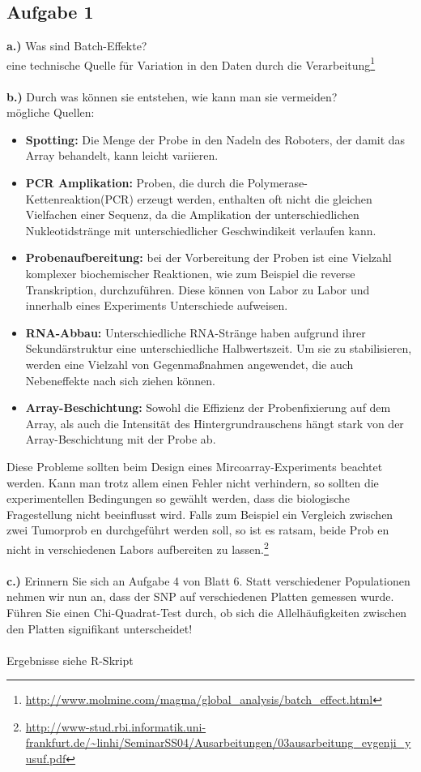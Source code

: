 \documentclass[13pt,a4paper]{article}
\begin{document}
\subsection{Aufgabe 1}
\textbf{a.)} Was sind Batch-Effekte?\\
eine technische Quelle für Variation in den Daten durch die Verarbeitung\footnote{\url{http://www.molmine.com/magma/global_analysis/batch_effect.html}}
\\\\
\textbf{b.)} Durch was können sie entstehen, wie kann man sie vermeiden?\\
mögliche Quellen:
\begin{itemize}
	\item \textbf{Spotting:} Die Menge der Probe in den Nadeln des Roboters, der damit das Array behandelt, kann leicht variieren.
	\item \textbf{PCR Amplikation:} Proben, die durch die Polymerase-Kettenreaktion(PCR) erzeugt werden, enthalten oft nicht die gleichen Vielfachen einer Sequenz, da die Amplikation der unterschiedlichen Nukleotidstränge mit unterschiedlicher Geschwindikeit verlaufen kann.
	\item \textbf{Probenaufbereitung:} bei der Vorbereitung der Proben ist eine Vielzahl komplexer biochemischer Reaktionen, wie zum Beispiel die reverse Transkription, durchzuführen. Diese können von Labor zu Labor und innerhalb eines Experiments Unterschiede aufweisen.
	\item \textbf{RNA-Abbau:} Unterschiedliche RNA-Stränge haben aufgrund ihrer Sekundärstruktur eine unterschiedliche Halbwertszeit. Um sie zu stabilisieren, werden eine Vielzahl von Gegenmaßnahmen angewendet, die auch Nebeneffekte nach sich ziehen können.
	\item \textbf{Array-Beschichtung:} Sowohl die Effizienz der Probenfixierung auf dem Array, als auch die Intensität des Hintergrundrauschens hängt stark von der Array-Beschichtung mit der Probe ab.
\end{itemize}
Diese Probleme sollten beim Design eines Mircoarray-Experiments beachtet werden. Kann man trotz allem einen Fehler nicht verhindern, so sollten die experimentellen Bedingungen so gewählt werden, dass die biologische Fragestellung nicht beeinflusst wird. Falls zum Beispiel ein Vergleich zwischen zwei Tumorprob en durchgeführt werden soll, so ist es ratsam, beide Prob en nicht in verschiedenen Labors aufbereiten zu lassen.\footnote{\url{http://www-stud.rbi.informatik.uni-frankfurt.de/~linhi/SeminarSS04/Ausarbeitungen/03ausarbeitung_evgenji_yusuf.pdf}}
\\\\
\textbf{c.)} Erinnern Sie sich an Aufgabe 4 von Blatt 6. Statt verschiedener Populationen nehmen wir nun an, dass der SNP auf verschiedenen Platten gemessen wurde. Führen Sie einen Chi-Quadrat-Test durch, ob sich die Allelhäufigkeiten zwischen den Platten signifikant unterscheidet!\\\\
Ergebnisse siehe R-Skript
\end{document}
